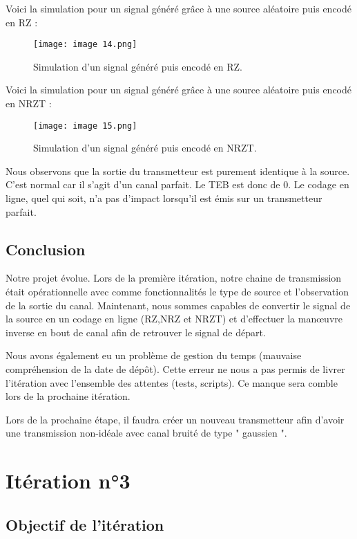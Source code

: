 Voici la simulation pour un signal généré grâce à une source aléatoire puis encodé en RZ :

\begin{figure}[h]
    \centering
    \texttt{[image: image 14.png]}
    \caption{\label{fig:image14}Simulation d'un signal généré puis encodé en RZ.}
\end{figure}

Voici la simulation pour un signal généré grâce à une source aléatoire puis encodé en NRZT :

\begin{figure}[h]
    \centering
    \texttt{[image: image 15.png]}
    \caption{\label{fig:image15}Simulation d'un signal généré puis encodé en NRZT.}
\end{figure}

Nous observons que la sortie du transmetteur est purement identique à la source. C'est normal car il s'agit d'un canal parfait. Le TEB est donc de 0. Le codage en ligne, quel qui soit, n'a pas d'impact
lorsqu'il est émis sur un transmetteur parfait.

\subsection{Conclusion}

Notre projet évolue. Lors de la première itération, notre chaine de transmission était opérationnelle avec comme fonctionnalités le type de source et l'observation de la sortie du canal.
Maintenant, nous sommes capables de convertir le signal de la source en un codage en ligne (RZ,NRZ et NRZT) et d'effectuer la manœuvre inverse en bout de canal afin de retrouver le signal de départ.

Nous avons également eu un problème de gestion du temps (mauvaise compréhension de la date de dépôt). Cette erreur ne nous a pas permis de livrer l'itération avec l'ensemble des attentes (tests, scripts). Ce manque sera comble lors de la prochaine itération.

Lors de la prochaine étape, il faudra créer un nouveau transmetteur afin d'avoir une transmission non-idéale avec canal bruité de type " gaussien ".

\pagebreak
\newpage

\section{Itération n°3}

\subsection{Objectif de l'itération}

